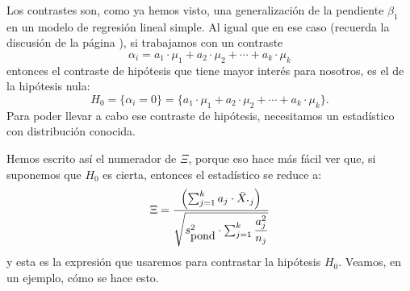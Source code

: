 Los contrastes son, como ya hemos visto, una generalización de la pendiente $\beta_1$ en un modelo de regresión lineal simple. Al igual que en ese caso (recuerda la discusión de la página \pageref{cap10:ecu:ContrastePendienteRegresionCalculoPValor}), si trabajamos con un contraste
\[\alpha_i=a_1\cdot\mu_1+a_2\cdot\mu_2+\cdots+a_k\cdot\mu_k\]
entonces el contraste de hipótesis que tiene mayor interés para nosotros, es el de la hipótesis nula:
\[H_0=\{\alpha_i=0\}=\{a_1\cdot\mu_1+a_2\cdot\mu_2+\cdots+a_k\cdot\mu_k\}.\]
Para poder llevar a cabo ese contraste de hipótesis, necesitamos un estadístico con distribución conocida.
    \begin{center}
    \end{center}
Hemos escrito así el numerador de $\Xi$, porque eso hace más fácil ver que, si suponemos que $H_0$ es cierta, entonces el estadístico se reduce a:
\[
             \Xi=\dfrac{
                \left(\sum_{j=1}^{k}a_j\cdot\bar X_{\mbox{\bf\large $\cdot$}j}\right)
             }{
             \sqrt{s^2_{\mbox{pond}}\cdot
                \sum_{j=1}^{k}\dfrac{a_j^2}{n_j}
             }
             }
\]
y esta es la expresión que usaremos para contrastar la hipótesis $H_0$. Veamos, en un ejemplo, cómo se hace esto.

